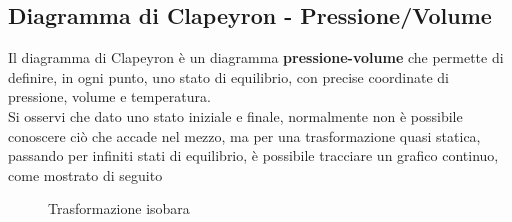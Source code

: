 \documentclass[a4paper]{extarticle}
\begin{document}
\vspace{1em}
\subsection{Diagramma di Clapeyron - Pressione/Volume}
Il diagramma di Clapeyron è un diagramma \textbf{pressione-volume} che permette di definire, in ogni punto, uno stato di equilibrio, con precise coordinate di pressione, volume e temperatura.\\
Si osservi che dato uno stato iniziale e finale, normalmente non è possibile conoscere ciò che accade nel mezzo, ma per una trasformazione quasi statica, passando per infiniti stati di equilibrio, è possibile tracciare un grafico continuo, come mostrato di seguito

\begin{figure}[H]


  \def\xtick#1#2{\draw[thick] (#1)++(0,.1) --++ (0,-.2) node[below=-.5pt,scale=0.9] {#2};}
  \def\ytick#1#2{\draw[thick] (#1)++(.1,0) --++ (-.2,0) node[left=-.5pt,scale=0.9] {#2};}

  \centering
  \def\xmax{3}
  \def\ymax{2.5}
  \caption{Trasformazione isobara}
  \label{fig:trasformazione_isobara}
\end{figure}
\end{document}
